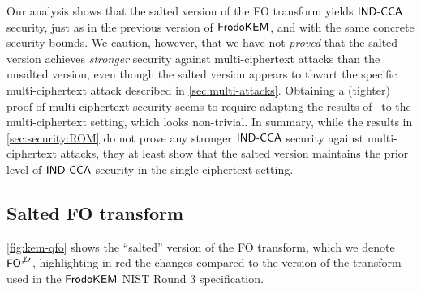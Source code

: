 \documentclass{iacrcc}
\begin{document}
Our analysis shows that the salted version of the FO transform yields $\textsf{\upshape\mdseries IND-CCA}$ security, just as in the previous version of $\textsf{\upshape\mdseries FrodoKEM}$, and with the same concrete security bounds.
We caution, however, that we have not \emph{proved} that the salted version achieves \emph{stronger} security against multi-ciphertext attacks than the unsalted version, even though the salted version appears to thwart the specific multi-ciphertext attack described in \autoref{sec:multi-attacks}.
Obtaining a (tighter) proof of multi-ciphertext security seems to require adapting the results of~\cite{TCC:HofHovKil17} to the multi-ciphertext setting, which looks non-trivial.
In summary, while the results in \autoref{sec:security:ROM} do not prove any stronger $\textsf{\upshape\mdseries IND-CCA}$ security against multi-ciphertext attacks, they at least show that the salted version maintains the prior level of $\textsf{\upshape\mdseries IND-CCA}$ security in the single-ciphertext setting.

\subsection{Salted FO transform}\label{sec:security:FO}

\autoref{fig:kem-qfo} shows the ``salted'' version of the FO transform, which we denote $\textsf{\upshape\mdseries FO}^{\not\perp\prime}$, {\color{red}highlighting in red} the changes compared to the version of the transform used in the $\textsf{\upshape\mdseries FrodoKEM}$ NIST Round 3 specification.
\end{document}
